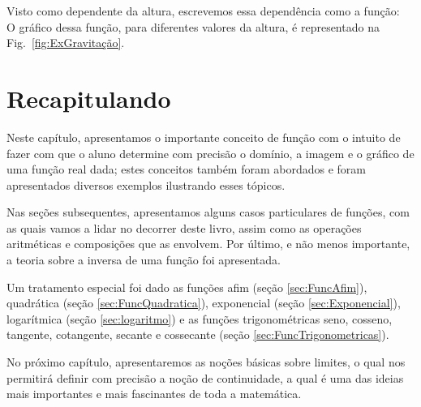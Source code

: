 \documentclass[../main.tex]{subfiles}
\begin{document}
\noindent Visto como dependente da altura, escrevemos essa dependência como a função:\\
\noindent O gráfico dessa função, para diferentes valores da altura, é representado na \mbox{Fig. \ref{fig:ExGravitação}.} 
\section{Recapitulando}
Neste capítulo, apresentamos o importante conceito de função com o intuito de fazer com que o aluno determine com precisão o domínio, a imagem e o gráfico de uma função real dada; estes conceitos também foram abordados e foram apresentados diversos exemplos ilustrando esses tópicos.

Nas seções subsequentes, apresentamos alguns casos particulares de funções, com as quais vamos a lidar no decorrer deste livro, assim como as operações aritméticas e composições que as envolvem. Por último, e não menos importante, a teoria sobre a inversa de uma função foi apresentada.

Um tratamento especial foi dado as funções afim (seção \ref{sec:FuncAfim}), quadrática (seção \ref{sec:FuncQuadratica}), exponencial (seção \ref{sec:Exponencial}), logarítmica (seção \ref{sec:logaritmo}) e as funções trigonométricas seno, cosseno, tangente, cotangente, secante e cossecante (seção \ref{sec:FuncTrigonometricas}).

No próximo capítulo, apresentaremos as noções básicas sobre limites, o qual nos permitirá definir com precisão a noção de continuidade, a qual é uma das ideias mais importantes e mais fascinantes de toda a matemática.
\end{document}
